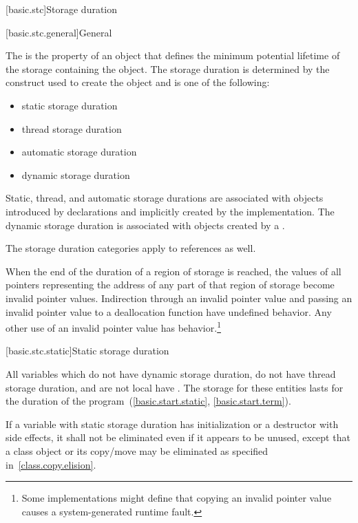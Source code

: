 [basic.stc]{Storage duration}

[basic.stc.general]{General}

\pnum
{}%
The  is the property of an object that defines the minimum
potential lifetime of the storage containing the object. The storage
duration is determined by the construct used to create the object and is
one of the following:
\begin{itemize}
\item static storage duration
\item thread storage duration
\item automatic storage duration
\item dynamic storage duration
\end{itemize}

\pnum
{}%
%
%
%
Static, thread, and automatic storage durations are associated with objects
introduced by declarations and implicitly created by
the implementation. The dynamic storage duration
is associated with objects created by a
.

\pnum
The storage duration categories apply to references as well.

\pnum
When the end of the duration of a region of storage is reached,
the values of all pointers
representing the address of any part of that region of storage
become invalid pointer values.
Indirection through an invalid pointer value and
passing an invalid pointer value to a deallocation function
have undefined behavior.
Any other use of an invalid pointer value has
behavior.\footnote{Some implementations might define that
copying an invalid pointer value
causes a system-generated runtime fault.}

[basic.stc.static]{Static storage duration}

\pnum
{}%
All variables which do not have dynamic storage duration, do not have thread
storage duration, and are not local
have . The
storage for these entities lasts for the duration of the
program~(\ref{basic.start.static}, \ref{basic.start.term}).

\pnum
If a variable with static storage duration has initialization or a
destructor with side effects, it shall not be eliminated even if it
appears to be unused, except that a class object or its copy/move may be
eliminated as specified in~\ref{class.copy.elision}.

